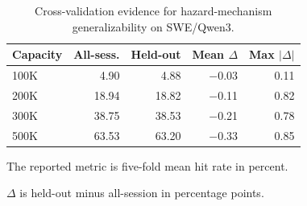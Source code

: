 \begin{table}[t]
\centering
\renewcommand{\arraystretch}{1.12}
\setlength{\tabcolsep}{4pt}
\scriptsize
\begin{threeparttable}
\caption{Cross-validation evidence for hazard-mechanism generalizability on SWE/Qwen3.}
\label{tab:lutcv}
\begin{tabular*}{\columnwidth}{@{\extracolsep{\fill}}lrrrr@{}}
\toprule
\textbf{Capacity} & \textbf{All-sess.\tnote{a}} & \textbf{Held-out\tnote{a}} &
\textbf{Mean $\Delta$ \tnote{b}} & \textbf{Max $\lvert\Delta\rvert$} \\
\midrule
100K & 4.90 & 4.88 & $-$0.03 & 0.11 \\
200K & 18.94 & 18.82 & $-$0.11 & 0.82 \\
300K & 38.75 & 38.53 & $-$0.21 & 0.78 \\
500K & 63.53 & 63.20 & $-$0.33 & 0.85 \\
\bottomrule
\end{tabular*}
\begin{tablenotes}\scriptsize
\item[a] The reported metric is five-fold mean hit rate in percent.
\item[b] $\Delta$ is held-out minus all-session in percentage points.
\end{tablenotes}
\end{threeparttable}
\end{table}
